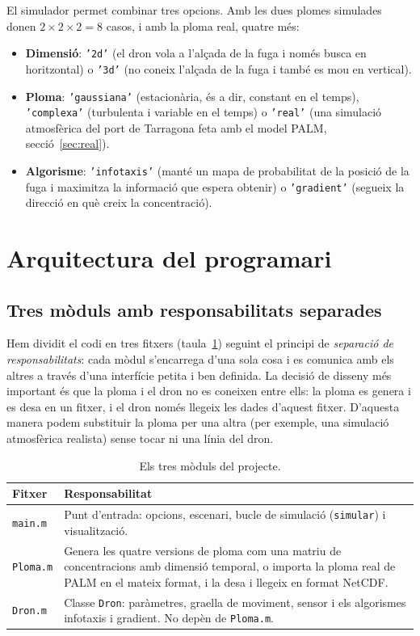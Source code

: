 \documentclass[11pt,a4paper]{article}
\begin{document}
El simulador permet combinar tres opcions. Amb les dues plomes simulades donen $2 \times 2 \times 2 = 8$ casos, i amb la ploma real, quatre més:
\begin{itemize}
\item \textbf{Dimensió}: \texttt{'2d'} (el dron vola a l'alçada de la fuga i només busca en horitzontal) o \texttt{'3d'} (no coneix l'alçada de la fuga i també es mou en vertical).
\item \textbf{Ploma}: \texttt{'gaussiana'} (estacionària, és a dir, constant en el temps), \texttt{'complexa'} (turbulenta i variable en el temps) o \texttt{'real'} (una simulació atmosfèrica del port de Tarragona feta amb el model PALM, secció~\ref{sec:real}).
\item \textbf{Algorisme}: \texttt{'infotaxis'} (manté un mapa de probabilitat de la posició de la fuga i maximitza la informació que espera obtenir) o \texttt{'gradient'} (segueix la direcció en què creix la concentració).
\end{itemize}

\section{Arquitectura del programari}
\label{sec:arquitectura}

\subsection{Tres mòduls amb responsabilitats separades}

Hem dividit el codi en tres fitxers (taula~\ref{tab:fitxers}) seguint el principi de \emph{separació de responsabilitats}: cada mòdul s'encarrega d'una sola cosa i es comunica amb els altres a través d'una interfície petita i ben definida. La decisió de disseny més important és que la ploma i el dron no es coneixen entre ells: la ploma es genera i es desa en un fitxer, i el dron només llegeix les dades d'aquest fitxer. D'aquesta manera podem substituir la ploma per una altra (per exemple, una simulació atmosfèrica realista) sense tocar ni una línia del dron.

\begin{table}[htbp]
\centering
\caption{Els tres mòduls del projecte.}
\label{tab:fitxers}
\begin{tabular}{@{}lp{11.8cm}@{}}
\toprule
Fitxer & Responsabilitat \\
\midrule
\texttt{main.m} & Punt d'entrada: opcions, escenari, bucle de simulació (\texttt{simular}) i visualització. \\
\texttt{Ploma.m} & Genera les quatre versions de ploma com una matriu de concentracions amb dimensió temporal, o importa la ploma real de PALM en el mateix format, i la desa i llegeix en format NetCDF. \\
\texttt{Dron.m} & Classe \texttt{Dron}: paràmetres, graella de moviment, sensor i els algorismes infotaxis i gradient. No depèn de \texttt{Ploma.m}. \\
\bottomrule
\end{tabular}
\end{table}
\end{document}
